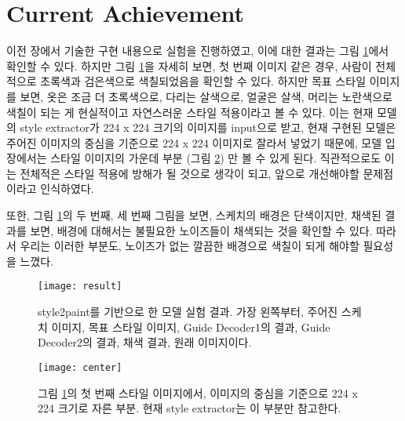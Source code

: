 \section{Current Achievement}

이전 장에서 기술한 구현 내용으로 실험을 진행하였고, 이에 대한 결과는 그림 \ref{fig:current}에서 확인할 수 있다.
하지만 그림 \ref{fig:current}을 자세히 보면, 첫 번째 이미지 같은 경우, 사람이 전체적으로 초록색과 검은색으로 색칠되었음을 확인할 수 있다.
하지만 목표 스타일 이미지를 보면, 옷은 조금 더 초록색으로, 다리는 살색으로, 얼굴은 살색, 머리는 노란색으로 색칠이 되는 게 현실적이고 자연스러운 스타일 적용이라고 볼 수 있다.
이는 현재 모델의 style extractor가 224 x 224 크기의 이미지를 input으로 받고, 현재 구현된 모델은 주어진 이미지의 중심을 기준으로 224 x 224 이미지로 잘라서 넣었기 때문에, 모델 입장에서는 스타일 이미지의 가운데 부분 (그림 \ref{fig:center}) 만 볼 수 있게 된다. 직관적으로도 이는 전체적은 스타일 적용에 방해가 될 것으로 생각이 되고, 앞으로 개선해야할 문제점이라고 인식하였다.

또한, 그림 \ref{fig:current}의 두 번째, 세 번째 그림을 보면, 스케치의 배경은 단색이지만, 채색된 결과를 보면, 배경에 대해서는 불필요한 노이즈들이 채색되는 것을 확인할 수 있다.
따라서 우리는 이러한 부분도, 노이즈가 없는 깔끔한 배경으로 색칠이 되게 해야할 필요성을 느꼈다.
\begin{figure}[t]
	\centering
	\texttt{[image: result]}
	\caption{style2paint를 기반으로 한 모델 실험 결과. 가장 왼쪽부터, 주어진 스케치 이미지, 목표 스타일 이미지, Guide Decoder1의 결과, Guide Decoder2의 결과, 채색 결과, 원래 이미지이다.}
	\label{fig:current}
\end{figure}

\begin{figure}[t]
	\centering
	\texttt{[image: center]}
	\caption{그림 \ref{fig:current}의 첫 번째 스타일 이미지에서, 이미지의 중심을 기준으로 224 x 224 크기로 자른 부분. 현재 style extractor는 이 부분만 참고한다.}
	\label{fig:center}
\end{figure}

